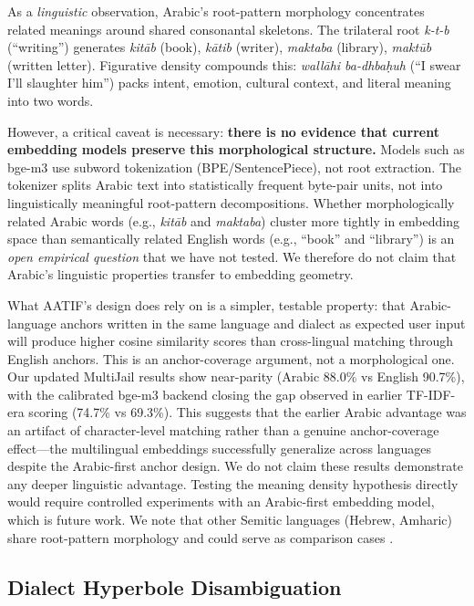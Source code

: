 \documentclass[11pt,a4paper]{article}
\begin{document}
As a \emph{linguistic} observation, Arabic's root-pattern morphology concentrates related meanings around shared consonantal skeletons. The trilateral root \emph{k-t-b} (``writing'') generates \emph{kit\=ab} (book), \emph{k\=atib} (writer), \emph{maktaba} (library), \emph{makt\=ub} (written letter). Figurative density compounds this: \emph{wall\=ahi ba-dhba\d{h}uh} (``I swear I'll slaughter him'') packs intent, emotion, cultural context, and literal meaning into two words.

However, a critical caveat is necessary: \textbf{there is no evidence that current embedding models preserve this morphological structure.} Models such as bge-m3 use subword tokenization (BPE/SentencePiece), not root extraction. The tokenizer splits Arabic text into statistically frequent byte-pair units, not into linguistically meaningful root-pattern decompositions. Whether morphologically related Arabic words (e.g., \emph{kit\=ab} and \emph{maktaba}) cluster more tightly in embedding space than semantically related English words (e.g., ``book'' and ``library'') is an \emph{open empirical question} that we have not tested. We therefore do not claim that Arabic's linguistic properties transfer to embedding geometry.

What AATIF's design does rely on is a simpler, testable property: that Arabic-language anchors written in the same language and dialect as expected user input will produce higher cosine similarity scores than cross-lingual matching through English anchors. This is an anchor-coverage argument, not a morphological one. Our updated MultiJail results show near-parity (Arabic 88.0\% vs English 90.7\%), with the calibrated bge-m3 backend closing the gap observed in earlier TF-IDF-era scoring (74.7\% vs 69.3\%). This suggests that the earlier Arabic advantage was an artifact of character-level matching rather than a genuine anchor-coverage effect---the multilingual embeddings successfully generalize across languages despite the Arabic-first anchor design. We do not claim these results demonstrate any deeper linguistic advantage. Testing the meaning density hypothesis directly would require controlled experiments with an Arabic-first embedding model, which is future work. We note that other Semitic languages (Hebrew, Amharic) share root-pattern morphology and could serve as comparison cases \citep{wolff2011,slobin1996}.


\subsection{Dialect Hyperbole Disambiguation}
\label{sec:hyperbole}
\end{document}
